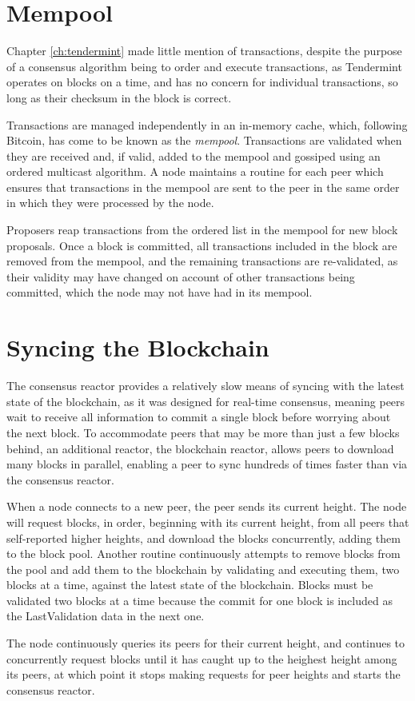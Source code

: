 \section{Mempool}

Chapter \ref{ch:tendermint} made little mention of transactions, 
despite the purpose of a consensus algorithm being to order and execute transactions,
as Tendermint operates on blocks on a time, and has no concern for individual transactions,
so long as their checksum in the block is correct.

Transactions are managed independently in an in-memory cache, 
which, following Bitcoin, has come to be known as the \emph{mempool}.
Transactions are validated when they are received and, if valid, 
added to the mempool and gossiped using an ordered multicast algorithm.
A node maintains a routine for each peer which ensures that transactions 
in the mempool are sent to the peer in the same order in which they were processed by the node.

Proposers reap transactions from the ordered list in the mempool for new block proposals.
Once a block is committed, all transactions included in the block are removed from the mempool,
and the remaining transactions are re-validated,
as their validity may have changed on account of other transactions being committed, 
which the node may not have had in its mempool.

\section{Syncing the Blockchain}

The consensus reactor provides a relatively slow means of syncing with the latest state of the blockchain,
as it was designed for real-time consensus,
meaning peers wait to receive all information to commit a single block before worrying about the next block.
To accommodate peers that may be more than just a few blocks behind, 
an additional reactor, the blockchain reactor, allows peers to download many blocks in parallel,
enabling a peer to sync hundreds of times faster than via the consensus reactor.

When a node connects to a new peer, the peer sends its current height.
The node will request blocks, in order, beginning with its current height,
from all peers that self-reported higher heights, and download the blocks concurrently, adding them to the block pool.
Another routine continuously attempts to remove blocks from the pool and add them to the blockchain by validating and executing them, 
two blocks at a time, against the latest state of the blockchain.
Blocks must be validated two blocks at a time because the commit for one block is included as the LastValidation data in the next one.

The node continuously queries its peers for their current height, 
and continues to concurrently request blocks until it has caught up to the heighest height among its peers, 
at which point it stops making requests for peer heights and starts the consensus reactor.


